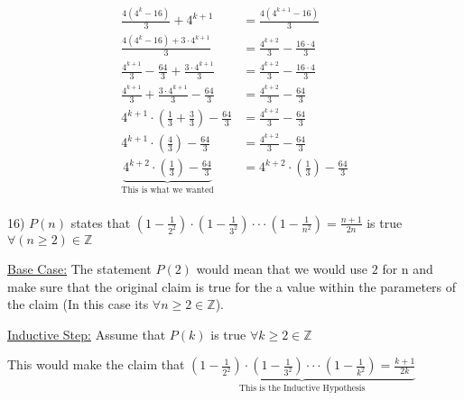 \documentclass[11pt]{article}
\begin{document}
\begin{flushleft}
\begin{align*}
\displaystyle{\frac{4(4^k-16)}{3}} + 4^{k+1}&= \displaystyle{\frac{4(4^{k+1}-16)}{3}}\\
\displaystyle{\frac{4(4^k-16)+ 3\cdot 4^{k+1}}{3}}&= \displaystyle{\frac{4^{k+2}}{3}-\frac{16\cdot 4}{3}}\\
\displaystyle{\frac{4^{k+1}}{3}- \frac{64}{3}} + \frac{3\cdot 4^{k+1}}{3}  &= \displaystyle{\frac{4^{k+2}}{3}-\frac{16\cdot 4}{3}}\\
\displaystyle{\frac{4^{k+1}}{3}+ \frac{3\cdot 4^{k+1}}{3}- \frac{64}{3}  }&= \displaystyle{\frac{4^{k+2}}{3}-\frac{64}{3}}\\
\displaystyle{4^{k+1}\cdot\left(\frac{1}{3}+ \frac{3}{3}\right)- \frac{64}{3}  }&= \displaystyle{\frac{4^{k+2}}{3}-\frac{64}{3}}\\
\displaystyle{4^{k+1}\cdot\left(\frac{4}{3}\right)- \frac{64}{3}  }&= \displaystyle{\frac{4^{k+2}}{3}-\frac{64}{3}}\\ 
\underbrace{\displaystyle{4^{k+2}\cdot\left(\frac{1}{3}\right)- \frac{64}{3}  }}\limits_{\text{This is what we wanted}}&= \displaystyle{4^{k+2}\cdot\left(\frac{1}{3}\right)- \frac{64}{3}  }\\ 
\end{align*}
\newpage

\vspace{3mm}

16) $P(n)$ states that $\displaystyle{\left(1-\frac{1}{2^2}\right)\cdot\left(1-\frac{1}{3^2}\right)\cdot \cdot \cdot\left(1-\frac{1}{n^2}\right) = \frac{n+1}{2n}}$ is true $ \forall (n\geq 2) \in \mathbb{Z}$ 

\vspace{5mm}

\underline{Base Case:} The statement $P(2)$ would mean that we would use $2$ for n and make sure that the original claim is true for the a value within the parameters of the claim (In this case its $\forall n\geq 2\in \mathbb{Z}$).

\vspace{5mm}

\underline{Inductive Step:} Assume that $P(k)$ is true $\forall k\geq 2 \in \mathbb{Z}$

This would make the claim that $\underbrace{\displaystyle{\left(1-\frac{1}{2^2}\right)\cdot\left(1-\frac{1}{3^2}\right)\cdot \cdot \cdot\left(1-\frac{1}{k^2}\right) = \frac{k+1}{2k}}}\limits_{\text{This is the Inductive Hypothesis}}$

\vspace{5mm}


\end{flushleft}
\end{document}

